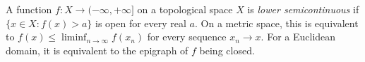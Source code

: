 
A function $f:X\to(-\infty,+\infty]$ on a topological space $X$ is \emph{lower semicontinuous} if $\{x\in X:f(x)>a\}$ is open for every real $a$. On a metric space, this is equivalent to $f(x)\le\liminf_{n\to\infty}f(x_n)$ for every sequence $x_n\to x$. For a Euclidean domain, it is equivalent to the epigraph of $f$ being closed.
